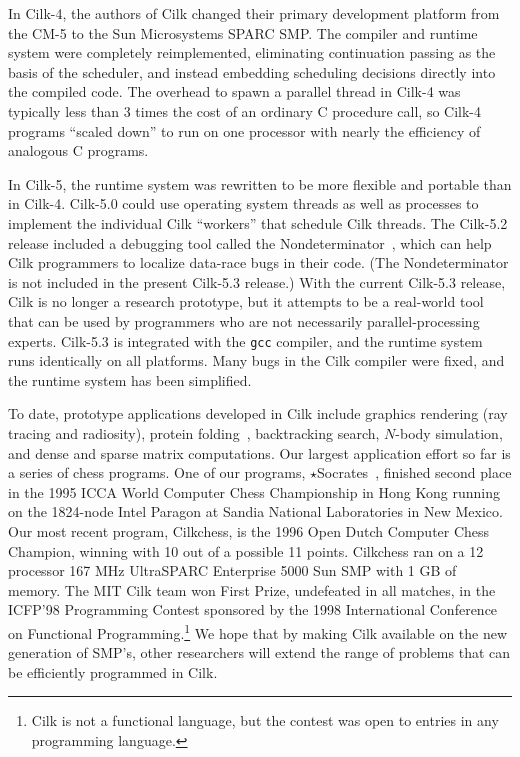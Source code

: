 In Cilk-4, the authors of Cilk changed their primary development
platform from the CM-5 to the Sun Microsystems SPARC SMP\@.  The
compiler and runtime system were completely reimplemented, eliminating
continuation passing as the basis of the scheduler, and instead
embedding scheduling decisions directly into the compiled code.  The
overhead to spawn a parallel thread in Cilk-4 was typically less than
3 times the cost of an ordinary C procedure call, so Cilk-4 programs
``scaled down'' to run on one processor with nearly the efficiency of
analogous C programs.

In Cilk-5, the runtime system was rewritten to be more flexible and
portable than in Cilk-4.  Cilk-5.0 could use operating system threads
as well as processes to implement the individual Cilk ``workers'' that
schedule Cilk threads.  The Cilk-5.2 release included a debugging tool
called the Nondeterminator~\cite{FengLe97, ChengFeLe98}, which can
help Cilk programmers to localize data-race bugs in their code.  (The
Nondeterminator is not included in the present Cilk-5.3 release.)
With the current Cilk-5.3 release, Cilk is no longer a research
prototype, but it attempts to be a real-world tool that can be used by
programmers who are not necessarily parallel-processing experts.
Cilk-5.3 is integrated with the \texttt{gcc} compiler, and the runtime
system runs identically on all platforms.  Many bugs in the Cilk
compiler were fixed, and the runtime system has been simplified.

To date, prototype applications developed in Cilk include graphics
rendering (ray tracing and radiosity), protein
folding~\cite{PandeJoGrTa94}, backtracking search, $N$-body
simulation, and dense and sparse matrix computations.  Our largest
application effort so far is a series of chess programs.  One of our
programs, $\star$Socrates~\cite{JoergKu94}, finished second place in
the 1995 ICCA World Computer Chess Championship in Hong Kong running
on the 1824-node Intel Paragon at Sandia National Laboratories in New
Mexico.  Our most recent program, Cilkchess, is the 1996 Open Dutch
Computer Chess Champion, winning with 10 out of a possible 11 points.
Cilkchess ran on a 12 processor 167 MHz UltraSPARC Enterprise 5000 Sun
SMP with 1 GB of memory.  The MIT Cilk team won First Prize,
undefeated in all matches, in the ICFP'98 Programming Contest
sponsored by the 1998 International Conference on Functional
Programming.\footnote{Cilk is not a functional language, but the
  contest was open to entries in any programming language.}  We hope
that by making Cilk available on the new generation of SMP's, other
researchers will extend the range of problems that can be efficiently
programmed in Cilk.

